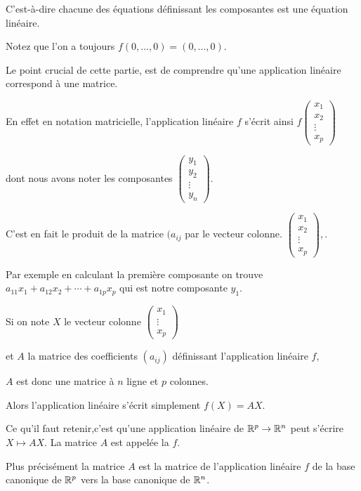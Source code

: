 C'est-à-dire chacune des équations définissant les composantes
est une équation linéaire.

Notez que l'on a toujours $f(0,\ldots,0) = (0,\ldots,0)$.

\change

Le point crucial de cette partie, est de comprendre qu'une
application linéaire correspond à une matrice.

En effet en notation matricielle, l'application linéaire $f$
s'écrit ainsi
$f\begin{pmatrix} x_1\\x_2 \\ \vdots \\x_p \end{pmatrix}$

dont nous avons noter les composantes 
$\begin{pmatrix} y_1\\ y_2\\ \vdots\\ y_n  \end{pmatrix}$.

C'est en fait le produit de la matrice  
$(a_{ij}$
par le vecteur colonne.
$
\begin{pmatrix} x_1\\x_2 \\ \vdots \\x_p \end{pmatrix},
$.

Par exemple en calculant la première composante 
on trouve $a_{11}x_1 + a_{12} x_2  +  \cdots  +  a_{1p}x_p$
qui est notre composante $y_1$.

\change
Si on note $X$ le vecteur colonne $\begin{pmatrix} x_1\\ \vdots \\x_p \end{pmatrix}$ 

et 
$A$ la matrice des coefficients $(a_{ij})$ définissant l'application linéaire $f$,

$A$ est donc une matrice à $n$ ligne et $p$ colonnes.

Alors l'application linéaire s'écrit simplement
$f(X)=AX.$

\change
Ce qu'il faut retenir,c'est qu'une application linéaire  de $\mathbb{R}^p \to \mathbb{R}^n$ 
peut s'écrire $X \mapsto A X$. La matrice $A$ est 
appelée la  $f$. 

Plus précisément la matrice $A$ est la matrice de l'application linéaire $f$
  de la base canonique de $\mathbb{R}^p$ vers la base canonique de $\mathbb{R}^n$.


